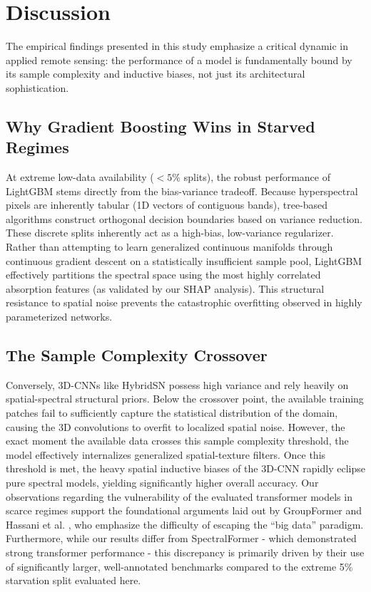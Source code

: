\documentclass[pdflatex,sn-mathphys-num,iicol]{sn-jnl}
\begin{document}
\section{Discussion}\label{sec:discussion}

The empirical findings presented in this study emphasize a critical dynamic in applied remote sensing: the performance of a model is fundamentally bound by its sample complexity and inductive biases, not just its architectural sophistication. 

\subsection{Why Gradient Boosting Wins in Starved Regimes}
At extreme low-data availability ($<5\%$ splits), the robust performance of LightGBM stems directly from the bias-variance tradeoff. Because hyperspectral pixels are inherently tabular (1D vectors of contiguous bands), tree-based algorithms construct orthogonal decision boundaries based on variance reduction. These discrete splits inherently act as a high-bias, low-variance regularizer. Rather than attempting to learn generalized continuous manifolds through continuous gradient descent on a statistically insufficient sample pool, LightGBM effectively partitions the spectral space using the most highly correlated absorption features (as validated by our SHAP analysis). This structural resistance to spatial noise prevents the catastrophic overfitting observed in highly parameterized networks.

\subsection{The Sample Complexity Crossover}
Conversely, 3D-CNNs like HybridSN possess high variance and rely heavily on spatial-spectral structural priors. Below the crossover point, the available training patches fail to sufficiently capture the statistical distribution of the domain, causing the 3D convolutions to overfit to localized spatial noise. However, the exact moment the available data crosses this sample complexity threshold, the model effectively internalizes generalized spatial-texture filters. Once this threshold is met, the heavy spatial inductive biases of the 3D-CNN rapidly eclipse pure spectral models, yielding significantly higher overall accuracy. Our observations regarding the vulnerability of the evaluated transformer models in scarce regimes support the foundational arguments laid out by GroupFormer \cite{b5} and Hassani et al. \cite{b24}, who emphasize the difficulty of escaping the ``big data'' paradigm. Furthermore, while our results differ from SpectralFormer \cite{b11} - which demonstrated strong transformer performance - this discrepancy is primarily driven by their use of significantly larger, well-annotated benchmarks compared to the extreme 5\% starvation split evaluated here.
\end{document}
